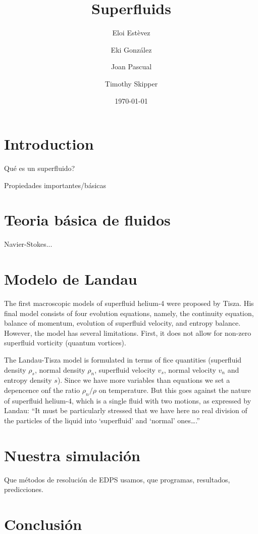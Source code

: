 \documentclass{article}
\title{Superfluids}
\author{
    Eloi Estèvez \and Eki González \and Joan Pascual \and Timothy Skipper
}
\date{\today}
\begin{document}
\maketitle
\begin{abstract}
\end{abstract}

\section{Introduction}

Qué es un superfluido?

Propiedades importantes/básicas

\section{Teoria básica de fluidos}

Navier-Stokes...

\section{Modelo de Landau}

The first macroscopic models of superfluid helium-4 were proposed by Tisza. His
final model consists of four evolution equations, namely, the continuity
equation, balance of momentum, evolution of superfluid velocity, and entropy
balance. However, the model has several limitations.  First, it does not allow
for non-zero superfluid vorticity (quantum vortices).

The Landau-Tisza model is formulated in terms of fice quantities (superfluid
density $\rho_s$, normal density $\rho_n$, superfluid velocity $v_s$, normal
velocity $v_n$ and entropy density $s$). Since we have more variables than
equations we set a depencence onf the ratio $\rho_n/\rho$ on temperature. But
this goes against the nature of superfluid helium-4, which is a single fluid
with two motions, as expressed by Landau: ``It must be particularly stressed
that we have here no real division of the particles of the liquid into
`superfluid' and `normal' ones\ldots.''

\section{Nuestra simulación}
Que métodos de resolución de EDPS usamos, que programas, resultados,
predicciones.

\section{Conclusión}
\end{document}
